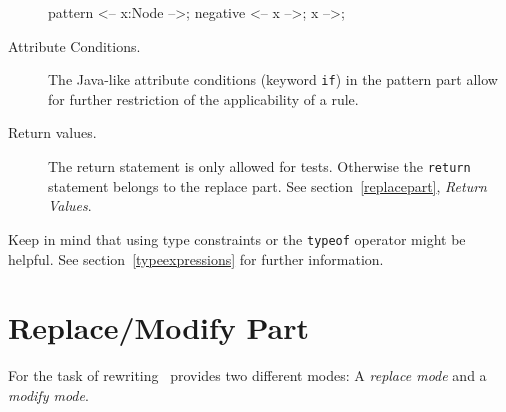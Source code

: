 \begin{description}
\begin{example}
    \begin{grgen}
pattern {
  <-- x:Node -->;
  negative {
    <-- x -->;
    x -->;
  }
}
    \end{grgen}
  \end{example}
  \item[Attribute Conditions.] The Java-like attribute conditions (keyword \texttt{if}) in the pattern part allow for further restriction of the applicability of a rule.
  \item[Return values.] The return statement is only allowed for tests. Otherwise the \texttt{return} statement belongs to the replace part. See section~\ref{replacepart}, \emph{Return Values}.
\end{description}
Keep in mind that using type constraints or the \texttt{typeof} operator might be helpful. See section~\ref{typeexpressions} for further information.

\section{Replace/Modify Part}
\label{replacepart}
For the task of rewriting \GrG\ provides two different modes: A \emph{replace mode} and a \emph{modify mode}.

